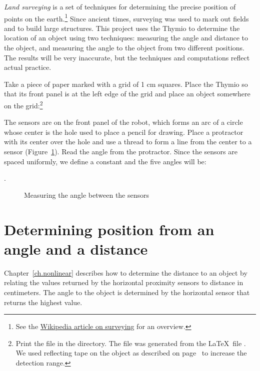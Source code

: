 \label{ch.survey}

\emph{Land surveying} is a set of techniques for determining the precise
position of points on the earth.\footnote{See the
\href{https://en.wikipedia.org/wiki/Surveying}{Wikipedia article on
surveying} for an overview.} Since ancient times, surveying was used to
mark out fields and to build large structures. This project uses the
Thymio to determine the location of an object using two techniques:
measuring the angle and distance to the object, and measuring the angle
to the object from two different positions. The results will be very
inaccurate, but the techniques and computations reflect actual practice.

Take a piece of paper marked with a grid of 1 cm squares. Place the
Thymio so that its front panel is at the left edge of the grid and place
an object somewhere on the grid:\footnote{Print the file 
in the  directory. The file was generated from the \LaTeX\
file . We used reflecting tape on the object as described
on page~\pageref{p.reflect} to increase the detection range.}



The sensors are on the front panel of the robot, which forms an arc of a
circle whose center is the hole used to place a pencil for drawing.
Place a protractor with its center over the hole and use a thread to form
a line from the center to a sensor (Figure~\ref{fig.angles}). Read the
angle from the protractor. Since the sensors are spaced uniformly, we
define a constant \p{THETA} and the five angles will be:

\begin{center}
.  
\end{center}

\begin{figure}
\caption{Measuring the angle between the sensors}\label{fig.angles}
\end{figure}

\section{Determining position from an angle and a distance}

Chapter~\ref{ch.nonlinear} describes how to determine the distance to an
object by relating the values returned by the horizontal proximity
sensors to distance in centimeters. The angle to the object is
determined by the horizontal sensor that returns the highest value.

